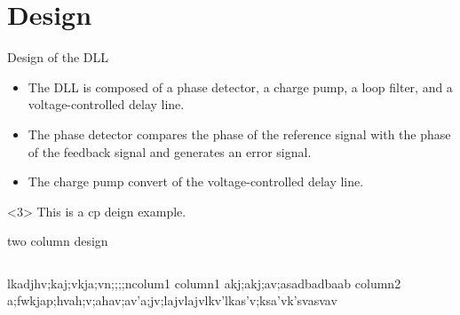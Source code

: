 \section{Design}

    \begin{frame}{Design of the DLL}
        \begin{itemize}
            \item<1-> The DLL is composed of a phase detector, a charge pump, a loop filter, and a voltage-controlled delay line.
            \item<2-> The phase detector compares the phase of the reference signal with the phase of the feedback signal and generates an error signal.
            \item<3> The charge pump convert of the voltage-controlled delay line.
        \end{itemize}

        \begin{example}<3>
            This is a cp deign example.
        \end{example}

    \end{frame}

    \begin{frame}{two column design}
        \begin{columns}
            lkadjhv;kaj;vkja;vn;;;;ncolum1 column1 akj;akj;av;asadbadbaab
            column2 a;fwkjap;hvah;v;ahav;av'a;jv;lajvlajvlkv'lkas'v;ksa'vk'svasvav
        \end{columns}
    \end{frame}